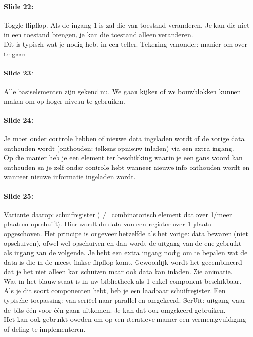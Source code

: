 \documentclass[10pt,a4paper]{book}
\begin{document}
\paragraph{Slide 22:} Toggle-flipflop. Als de ingang 1 is zal die van toestand veranderen. Je kan die niet in een toestand brengen, je kan die toestand alleen veranderen.\\
Dit is typisch wat je nodig hebt in een teller. Tekening vanonder: manier om over te gaan.

\paragraph{Slide 23:} Alle basiselementen zijn gekend nu. We gaan kijken of we bouwblokken kunnen maken om op hoger niveau te gebruiken.

\paragraph{Slide 24:} Je moet onder controle hebben of nieuwe data ingeladen wordt of de vorige data onthouden wordt (onthouden: telkens opnieuw inladen) via een extra ingang.\\
Op die manier heb je een element ter beschikking waarin je een gans woord kan onthouden en je zelf onder controle hebt wanneer nieuwe info onthouden wordt en wanneer nieuwe informatie ingeladen wordt.

\paragraph{Slide 25:} Variante daarop: schuifregister ($\neq$ combinatorisch element dat over 1/meer plaatsen opschuift). Hier wordt de data van een register over 1 plaats opgeschoven. Het principe is ongeveer hetzelfde als het vorige: data bewaren (niet opschuiven), ofwel wel opschuiven en dan wordt de uitgang van de ene gebruikt als ingang van de volgende. Je hebt een extra ingang nodig om te bepalen wat de data is die in de meest linkse flipflop komt. Gewoonlijk wordt het gecombineerd dat je het niet alleen kan schuiven maar ook data kan inladen. Zie animatie.\\
Wat in het blauw staat is in uw bibliotheek als 1 enkel component beschikbaar. Als je dit soort componenten hebt, heb je een laadbaar schuifregister. Een typische toepassing: van seri\"eel naar parallel en omgekeerd. SerUit: uitgang waar de bits \'e\'en voor \'e\'en gaan uitkomen. Je kan dat ook omgekeerd gebruiken.\\
Het kan ook gebruikt owrden om op een iteratieve manier een vermenigvuldiging of deling te implementeren. 
\end{document}
